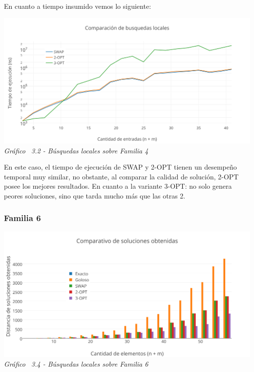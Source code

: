 En cuanto a tiempo insumido vemos lo siguiente:

\vspace*{0.3cm} \vspace*{0.3cm}
  \begin{center}
 \includegraphics[scale=0.5]{./EJ3/comparacionbusquedaslocalesgym0.png}
 {            \textit{Gráfico \ 3.2 - Búsquedas locales sobre Familia 4}}
  \end{center}
  \vspace*{0.3cm}

  
 En este caso, el tiempo de ejecuci\'on de SWAP y 2-OPT tienen un desempeño temporal muy similar, no obstante, al comparar la calidad de solución, 2-OPT posee los mejores resultados. En cuanto a la variante 3-OPT: no solo genera peores soluciones, sino que tarda mucho más que las otras 2. 


\subsubsection*{Familia 6}


\vspace*{0.3cm} \vspace*{0.3cm}
  \begin{center}
 \includegraphics[scale=0.5]{./EJ3/comparacionbusquedaslocalessolucionsinorden.png}
 {            \textit{Gráfico \ 3.4 - Búsquedas locales sobre Familia 6}}
  \end{center}
  \vspace*{0.3cm}


